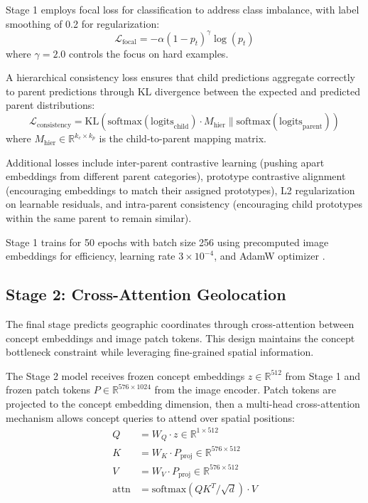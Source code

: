 \documentclass{uva-inf-article}
\begin{document}
Stage 1 employs focal loss \parencite{lin2017focal} for classification to address class imbalance, with label smoothing of 0.2 for regularization:
\begin{equation}
\mathcal{L}_{\text{focal}} = -\alpha(1-p_t)^\gamma \log(p_t)
\end{equation}
where $\gamma = 2.0$ controls the focus on hard examples.

A hierarchical consistency loss ensures that child predictions aggregate correctly to parent predictions through KL divergence between the expected and predicted parent distributions:
\begin{equation}
\mathcal{L}_{\text{consistency}} = \text{KL}(\text{softmax}(\text{logits}_{\text{child}}) \cdot M_{\text{hier}} \| \text{softmax}(\text{logits}_{\text{parent}}))
\end{equation}
where $M_{\text{hier}} \in \mathbb{R}^{k_c \times k_p}$ is the child-to-parent mapping matrix.

Additional losses include inter-parent contrastive learning (pushing apart embeddings from different parent categories), prototype contrastive alignment (encouraging embeddings to match their assigned prototypes), L2 regularization on learnable residuals, and intra-parent consistency (encouraging child prototypes within the same parent to remain similar).

Stage 1 trains for 50 epochs with batch size 256 using precomputed image embeddings for efficiency, learning rate $3 \times 10^{-4}$, and AdamW optimizer \parencite{loshchilov2017adamw}.

\subsection{Stage 2: Cross-Attention Geolocation}

The final stage predicts geographic coordinates through cross-attention between concept embeddings and image patch tokens. This design maintains the concept bottleneck constraint while leveraging fine-grained spatial information.

The Stage 2 model receives frozen concept embeddings $z \in \mathbb{R}^{512}$ from Stage 1 and frozen patch tokens $P \in \mathbb{R}^{576 \times 1024}$ from the image encoder. Patch tokens are projected to the concept embedding dimension, then a multi-head cross-attention mechanism \parencite{vaswani2017attention} allows concept queries to attend over spatial positions:
\begin{align}
Q &= W_Q \cdot z \in \mathbb{R}^{1 \times 512} \\
K &= W_K \cdot P_{\text{proj}} \in \mathbb{R}^{576 \times 512} \\
V &= W_V \cdot P_{\text{proj}} \in \mathbb{R}^{576 \times 512} \\
\text{attn} &= \text{softmax}(QK^T / \sqrt{d}) \cdot V
\end{align}
\end{document}
